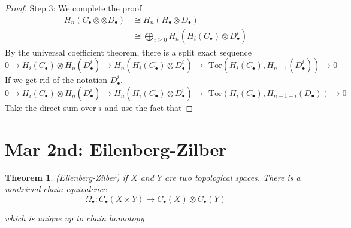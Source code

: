 \documentclass[11pt]{article}
\newtheorem{thm}{Theorem}[section]
\newcommand{\tor}{\text{ Tor}}
\newcommand{\lrta}{\longrightarrow}
\begin{document}
\begin{proof}
Step 3: We complete the proof
$$
\begin{aligned}
H_n(C_\bullet \otimes \otimes D_\bullet)&\cong H_n(H_\bullet\otimes D_\bullet)\\
&\cong \bigoplus_{i\geq 0} H_n(H_i(C_\bullet)\otimes D_\bullet^i)
\end{aligned}
$$
By the universal coefficient theorem, there is a split exact sequence
$$
0\lrta H_i(C_\bullet)\otimes H_n(D^i_\bullet)\lrta H_n(H_i(C_\bullet)\otimes D^i_\bullet)\lrta \tor(H_i (C_\bullet),H_{n-1}(D^i_\bullet))\lrta 0
$$
If we get rid of the notation $D^i_\bullet$.
$$0\lrta H_i(C_\bullet)\otimes H_n(D^i_\bullet)\lrta H_n(H_i(C_\bullet)\otimes D^i_\bullet)\lrta \tor(H_i (C_\bullet),H_{n-1-i}(D_\bullet))\lrta 0
$$
Take the direct sum over $i$ and use the fact that 


\end{proof}


\section{Mar 2nd: Eilenberg-Zilber}

\begin{thm}
(Eilenberg-Zilber) if $X$ and $Y$ are two topological spaces. There is a nontrivial chain equivalence
$$
\Omega_\bullet: C_\bullet(X\times Y)\lrta C_\bullet(X)\otimes C_\bullet (Y)
$$

which is unique up to chain homotopy
\end{thm}
\end{document}
